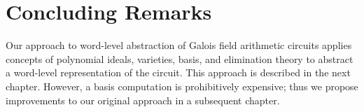 


\section{Concluding Remarks}

Our approach to word-level abstraction of Galois field arithmetic 
circuits applies concepts of polynomial ideals, varieties, \Grobner basis, 
and elimination theory to abstract a word-level representation of the 
circuit. This approach is described in the next chapter. However, a \Grobner
basis computation is prohibitively expensive; thus we propose improvements 
to our original approach in a subsequent chapter.

